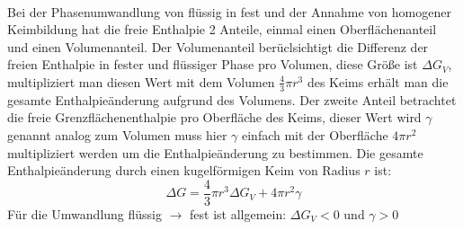 \documentclass[11pt,a4paper]{article}
\numberwithin{equation}{section}
\numberwithin{figure}{section}
\begin{document}
\\
\begin{addmargin}[25pt]{0pt}
Bei der Phasenumwandlung von flüssig in fest und der Annahme von homogener Keimbildung hat die freie Enthalpie 2 Anteile, einmal einen Oberflächenanteil und einen Volumenanteil. Der Volumenanteil berüclsichtigt die Differenz der freien Enthalpie in fester und flüssiger Phase pro Volumen, diese Größe ist $\Delta G_V$, multipliziert man diesen Wert mit dem Volumen $\frac{4}{3}\pi r^3$ des Keims erhält man die gesamte Enthalpieänderung aufgrund des Volumens. Der zweite Anteil betrachtet die freie Grenzflächenenthalpie pro Oberfläche des Keims, dieser Wert wird $\gamma$ genannt analog zum Volumen muss hier $\gamma$ einfach mit der Oberfläche $4\pi r^2$ multipliziert werden um die Enthalpieänderung zu bestimmen. Die gesamte Enthalpieänderung durch einen kugelförmigen Keim von Radius $r$ ist:
\begin{equation}\label{eq:enthalpie_homogene_Keimbildung}
    \Delta G = \frac{4}{3}\pi r^3 \Delta G_V + 4\pi r^2 \gamma
\end{equation}
Für die Umwandlung flüssig $\rightarrow$ fest ist allgemein: $\Delta G_V <0$ und $\gamma >0$\\
\end{addmargin}
\end{document}
